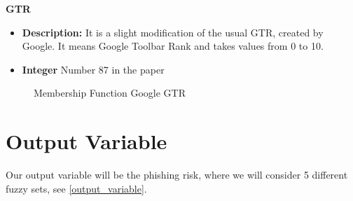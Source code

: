 \documentclass[11pt]{article}
\begin{document}
\textbf{GTR} 
\begin{itemize}
    \item \textbf{Description:} It is a slight modification of the usual GTR, created by Google. It means Google Toolbar Rank and takes values from 0 to 10.
    \item \textbf{Integer} Number 87 in the paper
\end{itemize}

\begin{figure}[H]
    \centering
    \caption{Membership Function Google GTR}
\end{figure}



\section{Output Variable}
Our output variable will be the phishing risk, where we will consider 5 different fuzzy sets, see \ref{output_variable}.
\end{document}
